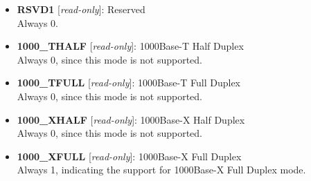 \vspace{12pt}
\noindent
{}

\begin{itemize}
\item \begin{small}
{\bf 
RSVD1
} [\emph{read-only}]: Reserved
\\
Always 0.
\end{small}
\item \begin{small}
{\bf 
1000\_THALF
} [\emph{read-only}]: 1000Base-T Half Duplex
\\
Always 0, since this mode is not supported.
\end{small}
\item \begin{small}
{\bf 
1000\_TFULL
} [\emph{read-only}]: 1000Base-T Full Duplex
\\
Always 0, since this mode is not supported.
\end{small}
\item \begin{small}
{\bf 
1000\_XHALF
} [\emph{read-only}]: 1000Base-X Half Duplex
\\
Always 0, since this mode is not supported.
\end{small}
\item \begin{small}
{\bf 
1000\_XFULL
} [\emph{read-only}]: 1000Base-X Full Duplex
\\
Always 1, indicating the support for 1000Base-X Full Duplex mode.
\end{small}
\end{itemize}
